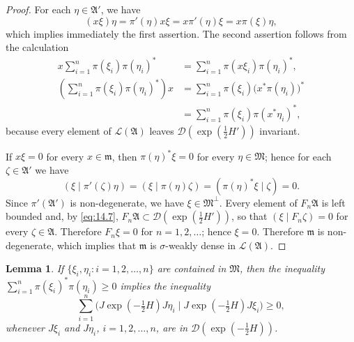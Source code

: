 \documentclass[12pt,b5paper,twoside]{article}
\theoremstyle{takesaki}
\newtheorem{lemma}{Lemma}[section]
\numberwithin{equation}{section}
\begin{document}
\begin{proof}
For each $\eta\in\mathfrak A'$, we have
\[
  (x\xi)\eta=\pi'(\eta)x\xi=x\pi'(\eta)\xi=x\pi(\xi)\eta,
\]
which implies immediately the first assertion.  The second assertion
follows from the calculation
\begin{align*}
  x\sum_{i=1}^{n}\pi(\xi_i)\pi(\eta_i)^*
    &=\sum_{i=1}^{n}\pi(x\xi_i)\pi(\eta_i)^*,\\
  \left(\sum_{i=1}^{n}\pi(\xi_i)\pi(\eta_i)^*\right)x
    &=\sum_{i=1}^{n}\pi(\xi_i)\bigl(x^*\pi(\eta_i)\bigr)^*\\
    &=\sum_{i=1}^{n}\pi(\xi_i)\pi(x^*\eta_i)^*,
\end{align*}
because every element of $\mathcal L(\mathfrak A)$ leaves
$\mathcal D(\exp(\tfrac12H'))$ invariant.

If $x\xi=0$ for every $x\in\mathfrak m$, then
$\pi(\eta)^*\xi=0$ for every $\eta\in\mathfrak M$; hence for each
$\zeta\in\mathfrak A'$ we have
\[
  (\xi\mid\pi'(\zeta)\eta)
   =(\xi\mid\pi(\eta)\zeta)
   =(\pi(\eta)^*\xi\mid\zeta)=0.
\]
Since $\pi'(\mathfrak A')$ is non-degenerate, we have
$\xi\in\mathfrak M^\perp$.  Every element of $F_n\mathfrak A$ is
left bounded and, by \eqref{eq:14.7},
$F_n\mathfrak A\subset\mathcal D(\exp(\tfrac12H'))$, so that
$(\xi\mid F_n\zeta)=0$ for every $\zeta\in\mathfrak A$.  Therefore
$F_n\xi=0$ for $n=1,2,\ldots$; hence $\xi=0$.  Therefore
$\mathfrak m$ is non-degenerate, which implies that $\mathfrak m$ is
$\sigma$-weakly dense in $\mathcal L(\mathfrak A)$.
\end{proof}

\begin{lemma}\label{lem:14.2}
If $\{\xi_i,\eta_i:i=1,2,\ldots,n\}$ are contained in $\mathfrak M$,
then the inequality
$\sum_{i=1}^{n}\pi(\xi_i)^*\pi(\eta_i)\geq0$ implies the inequality
\begin{equation}
  \sum_{i=1}^{n}
  \bigl(J\exp(-\tfrac12H)J\eta_i
       \mid J\exp(-\tfrac12H)J\xi_i\bigr)\geq0,
  \tag{14.10}\label{eq:14.10}
\end{equation}
whenever $J\xi_i$ and $J\eta_i$, $i=1,2,\ldots,n$, are in
$\mathcal D(\exp(-\tfrac12H))$.
\end{lemma}
\end{document}
